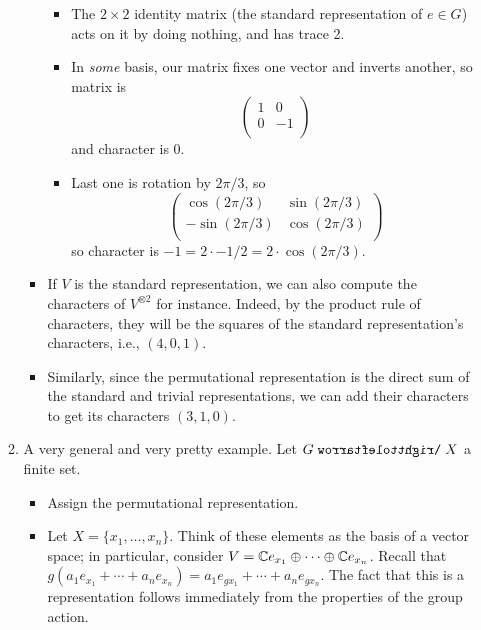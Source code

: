 \documentclass[../notes.tex]{subfiles}
\begin{document}
\begin{itemize}
\begin{enumerate}
\begin{itemize}
\begin{itemize}
                \item The $2\times 2$ identity matrix (the standard representation of $e\in G$) acts on it by doing nothing, and has trace 2.
                \item In \emph{some} basis, our matrix fixes one vector and inverts another, so matrix is
                \begin{equation*}
                    \begin{pmatrix}
                        1 & 0\\
                        0 & -1\\
                    \end{pmatrix}
                \end{equation*}
                and character is 0.
                \item Last one is rotation by $2\pi/3$, so
                \begin{equation*}
                    \begin{pmatrix}
                        \cos(2\pi/3) & \sin(2\pi/3)\\
                        -\sin(2\pi/3) & \cos(2\pi/3)\\
                    \end{pmatrix}
                \end{equation*}
                so character is $-1=2\cdot -1/2=2\cdot\cos(2\pi/3)$.
            \end{itemize}
            \item If $V$ is the standard representation, we can also compute the characters of $V^{\otimes 2}$ for instance. Indeed, by the product rule of characters, they will be the squares of the standard representation's characters, i.e., $(4,0,1)$.
            \item Similarly, since the permutational representation is the direct sum of the standard and trivial representations, we can add their characters to get its characters $(3,1,0)$.
        \end{itemize}
        \item A very general and very pretty example. Let $G\acts X$ a finite set.
        \begin{itemize}
            \item Assign the permutational representation.
            \item Let $X=\{x_1,\dots,x_n\}$. Think of these elements as the basis of a vector space; in particular, consider $V=\mathbb{C} e_{x_1}\oplus\cdots\oplus\mathbb{C} e_{x_n}$. Recall that $g(a_1e_{x_1}+\cdots+a_ne_{x_n})=a_1e_{gx_1}+\cdots+a_ne_{gx_n}$. The fact that this is a representation follows immediately from the properties of the group action.

\end{itemize}
\end{enumerate}
\end{itemize}
\end{document}
